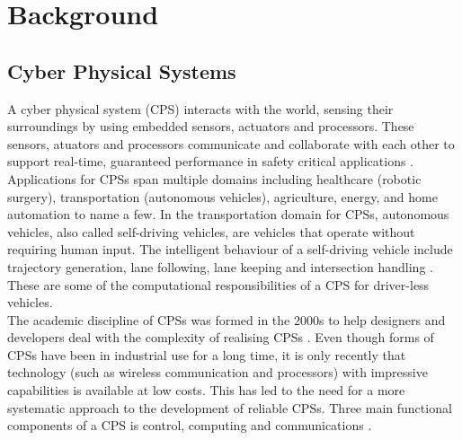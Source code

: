 \chapter{Background} \label{sect:background} 
\section{Cyber Physical Systems}

A cyber physical system (CPS) interacts with the world, sensing their surroundings by using embedded sensors, actuators and processors. These sensors, atuators and processors communicate and collaborate with each other to support real-time, guaranteed performance in safety critical applications \cite{sidcyber}. Applications for CPSs span multiple domains including healthcare (robotic surgery), transportation (autonomous vehicles), agriculture, energy, and home automation to name a few. In the transportation domain for CPSs, autonomous vehicles, also called self-driving vehicles, are vehicles that operate without requiring human input. The intelligent behaviour of a self-driving vehicle include trajectory generation, lane following, lane keeping and intersection handling \cite{sidcyber}. These are some of the computational responsibilities of a CPS for driver-less vehicles.\\ 

The academic discipline of CPSs was formed in the 2000s \cite{alur} to help designers and developers deal with the complexity of realising CPSs \cite{gonz}. Even though forms of CPSs have been in industrial use for a long time, it is only recently that technology (such as wireless communication and processors) with impressive capabilities is available at low costs. This has led to the need for a more systematic approach to the development of reliable CPSs. Three main functional components of a CPS is control, computing and communications \cite{alur}.\\

